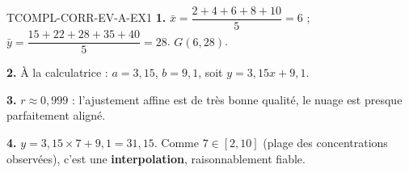\begin{corrige}{TCOMPL-CORR-EV-A-EX1}
\textbf{1.} $\bar{x} = \dfrac{2+4+6+8+10}{5} = 6$ ; $\bar{y} = \dfrac{15+22+28+35+40}{5} = 28$. $G(6,28)$.

\textbf{2.} À la calculatrice : $a=3{,}15$, $b=9{,}1$, soit $y=3{,}15x+9{,}1$.

\textbf{3.} $r \approx 0{,}999$ : l'ajustement affine est de très bonne qualité, le nuage est presque parfaitement aligné.

\textbf{4.} $y = 3{,}15\times7+9{,}1 = 31{,}15$. Comme $7\in[2,10]$ (plage des concentrations observées), c'est une \textbf{interpolation}, raisonnablement fiable.
\end{corrige}
